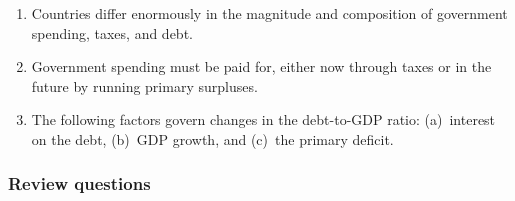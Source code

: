 \documentclass[letterpaper,12pt]{article}
\begin{document}
\begin{enumerate}

\item Countries differ enormously in the magnitude and composition
of government spending, taxes, and debt.

\item Government spending must be paid for, either now through
taxes or in the future by running primary surpluses.

\item The following factors govern changes in the debt-to-GDP ratio:
(a)~interest on the debt,
(b)~GDP growth,
and (c)~the primary deficit.

\end{enumerate}

\subsubsection*{Review questions}
\end{document}
